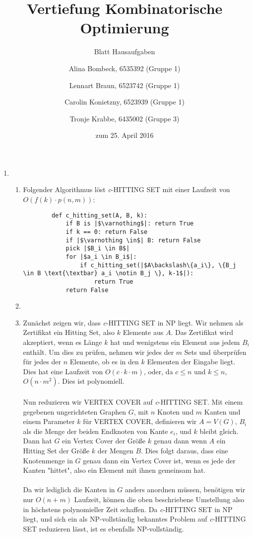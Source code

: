 \documentclass[a4paper]{scrartcl}
\title{Vertiefung Kombinatorische Optimierung}
\subtitle{Blatt {\blattnr} Hausaufgaben}
\author{%
    Alina Bombeck, 6535392 (Gruppe 1) \and
    Lennart Braun, 6523742 (Gruppe 1) \and
    Carolin Konietzny, 6523939 (Gruppe 1) \and
    Tronje Krabbe, 6435002 (Gruppe 3)
}
\date{zum 25. April 2016}
\begin{document}
\maketitle


\begin{enumerate}[label=\bfseries \arabic*.]
\item %
\begin{enumerate}
    \item %
        Folgender Algorithmus löst \textit{c}-HITTING SET mit einer Laufzeit von \\
        $O(f(k) \cdot p(n, m))$:
        \begin{verbatim}
        def c_hitting_set(A, B, k):
            if B is |$\varnothing$|: return True
            if k == 0: return False
            if |$\varnothing \in$| B: return False
            pick |$B_i \in B$|
            for |$a_i \in B_i$|:
                if c_hitting_set(|$A\backslash\{a_i\}, \{B_j \in B \text{\textbar} a_i \notin B_j \}, k-1$|):
                    return True
            return False
        \end{verbatim}

    \item %

    \item %
        Zunächst zeigen wir, dass \textit{c}-HITTING SET in NP liegt.
        Wir nehmen als Zertifikat ein Hitting Set, also $k$ Elemente aus $A$.
        Das Zertifikat wird akzeptiert, wenn es Länge $k$ hat und wenigstens ein
        Element aus jedem $B_i$ enthält. Um dies zu prüfen, nehmen wir jedes der
        $m$ Sets und überprüfen für jedes der $n$ Elemente, ob es in den $k$ Elementen
        der Eingabe liegt. Dies hat eine Laufzeit von $O(c \cdot k \cdot m)$, oder,
        da $c \leq n$ und $k \leq n$, $O(n \cdot m^2)$. Dies ist polynomiell.
        \\
        \\
        Nun reduzieren wir VERTEX COVER auf \textit{c}-HITTING SET.
        Mit einem gegebenen ungerichteten Graphen $G$, mit $n$ Knoten und $m$ Kanten
        und einem Parameter $k$ für VERTEX COVER, definieren wir $A = V(G)$, $B_i$
        als die Menge der beiden Endknoten von Kante $e_i$, und $k$ bleibt gleich.
        Dann hat $G$ ein Vertex Cover der Größe $k$ genau dann wenn $A$ ein
        Hitting Set der Größe $k$ der Mengen $B$. Dies folgt daraus, dass
        eine Knotenmenge in $G$ genau dann ein Vertex Cover ist, wenn
        es jede der Kanten "hittet", also ein Element mit ihnen gemeinsam hat.
        \\
        \\
        Da wir lediglich die Kanten in $G$ anders anordnen müssen, benötigen
        wir nur $O(n + m)$ Laufzeit, können die oben beschriebene Umstellung also
        in höchstens polynomieller Zeit schaffen. Da \textit{c}-HITTING SET
        in NP liegt, und sich ein als NP-vollständig bekanntes Problem auf
        \textit{c}-HITTING SET reduzieren lässt, ist es ebenfalls NP-vollständig.
\end{enumerate}


\end{enumerate}
\end{document}
